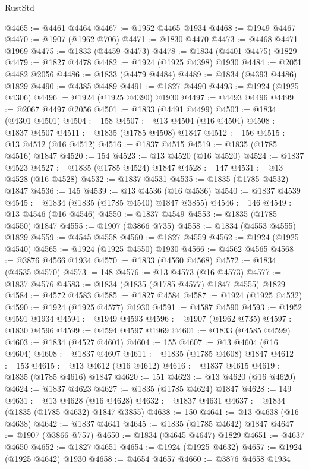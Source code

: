 \begin{lexlean}{RustStd}
\begin{coremodule}
@4465 := @4461 @4464
@4467 := @1952 @4465 @1934
@4468 := @1949 @4467
@4470 := @1907 (@1962 @706)
@4471 := @1830 @4470
@4473 := @4468 @4471 @1969
@4475 := @1833 (@4459 @4473)
@4478 := @1834 (@4401 @4475) @1829
@4479 := @1827 @4478
@4482 := @1924 (@1925 @4398) @1930
@4484 := @2051 @4482 @2056
@4486 := @1833 (@4479 @4484)
@4489 := @1834 (@4393 @4486) @1829
@4490 := @4385 @4489
@4491 := @1827 @4490
@4493 := @1924 (@1925 @4306)
@4496 := @1924 (@1925 @4390) @1930
@4497 := @4493 @4496
@4499 := @2067 @4497 @2056
@4501 := @1833 (@4491 @4499)
@4503 := @1834 (@4301 @4501)
@4504 := 158
@4507 := @13 @4504 (@16 @4504)
@4508 := @1837 @4507
@4511 := @1835 (@1785 @4508) @1847
@4512 := 156
@4515 := @13 @4512 (@16 @4512)
@4516 := @1837 @4515
@4519 := @1835 (@1785 @4516) @1847
@4520 := 154
@4523 := @13 @4520 (@16 @4520)
@4524 := @1837 @4523
@4527 := @1835 (@1785 @4524) @1847
@4528 := 147
@4531 := @13 @4528 (@16 @4528)
@4532 := @1837 @4531
@4535 := @1835 (@1785 @4532) @1847
@4536 := 145
@4539 := @13 @4536 (@16 @4536)
@4540 := @1837 @4539
@4545 := @1834 (@1835 (@1785 @4540) @1847 @3855)
@4546 := 146
@4549 := @13 @4546 (@16 @4546)
@4550 := @1837 @4549
@4553 := @1835 (@1785 @4550) @1847
@4555 := @1907 (@3866 @735)
@4558 := @1834 (@4553 @4555) @1829
@4559 := @4545 @4558
@4560 := @1827 @4559
@4562 := @1924 (@1925 @4540)
@4565 := @1924 (@1925 @4550) @1930
@4566 := @4562 @4565
@4568 := @3876 @4566 @1934
@4570 := @1833 (@4560 @4568)
@4572 := @1834 (@4535 @4570)
@4573 := 148
@4576 := @13 @4573 (@16 @4573)
@4577 := @1837 @4576
@4583 := @1834 (@1835 (@1785 @4577) @1847 @4555) @1829
@4584 := @4572 @4583
@4585 := @1827 @4584
@4587 := @1924 (@1925 @4532)
@4590 := @1924 (@1925 @4577) @1930
@4591 := @4587 @4590
@4593 := @1952 @4591 @1934
@4594 := @1949 @4593
@4596 := @1907 (@1962 @735)
@4597 := @1830 @4596
@4599 := @4594 @4597 @1969
@4601 := @1833 (@4585 @4599)
@4603 := @1834 (@4527 @4601)
@4604 := 155
@4607 := @13 @4604 (@16 @4604)
@4608 := @1837 @4607
@4611 := @1835 (@1785 @4608) @1847
@4612 := 153
@4615 := @13 @4612 (@16 @4612)
@4616 := @1837 @4615
@4619 := @1835 (@1785 @4616) @1847
@4620 := 151
@4623 := @13 @4620 (@16 @4620)
@4624 := @1837 @4623
@4627 := @1835 (@1785 @4624) @1847
@4628 := 149
@4631 := @13 @4628 (@16 @4628)
@4632 := @1837 @4631
@4637 := @1834 (@1835 (@1785 @4632) @1847 @3855)
@4638 := 150
@4641 := @13 @4638 (@16 @4638)
@4642 := @1837 @4641
@4645 := @1835 (@1785 @4642) @1847
@4647 := @1907 (@3866 @757)
@4650 := @1834 (@4645 @4647) @1829
@4651 := @4637 @4650
@4652 := @1827 @4651
@4654 := @1924 (@1925 @4632)
@4657 := @1924 (@1925 @4642) @1930
@4658 := @4654 @4657
@4660 := @3876 @4658 @1934

\end{coremodule}
\end{lexlean}
